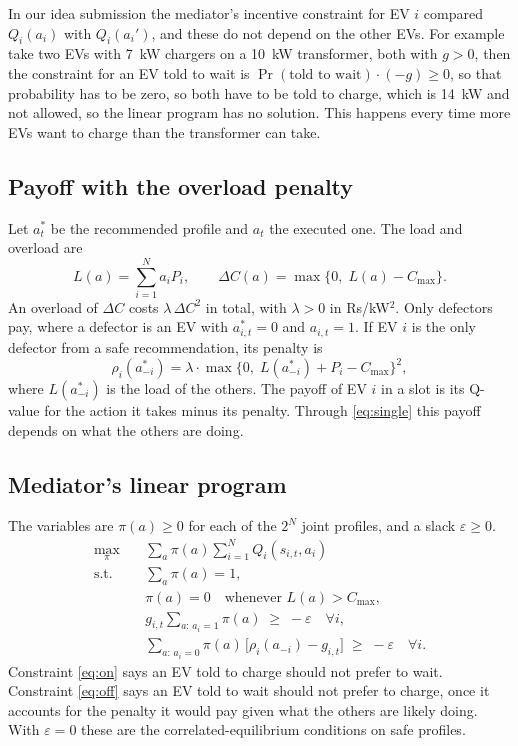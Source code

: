 \documentclass{article}
\newcommand{\cmax}{C_{\max}}
\begin{document}
In our idea submission the mediator's incentive constraint for EV $i$ compared $Q_i(a_i)$ with $Q_i(a_i')$, and these do not depend on the other EVs. For example take two EVs with 7~kW chargers on a 10~kW transformer, both with $g > 0$, then the constraint for an EV told to wait is $\Pr(\text{told to wait}) \cdot (-g) \ge 0$, so that probability has to be zero, so both have to be told to charge, which is 14~kW and not allowed, so the linear program has no solution. This happens every time more EVs want to charge than the transformer can take.

\subsection{Payoff with the overload penalty}

Let $a^*_t$ be the recommended profile and $a_t$ the executed one. The load and overload are
\begin{equation}
L(a) = \sum_{i=1}^{N} a_i P_i, \qquad \Delta C(a) = \max\{0,\; L(a) - \cmax\}.
\end{equation}
An overload of $\Delta C$ costs $\lambda\,\Delta C^2$ in total, with $\lambda > 0$ in Rs/kW$^2$. Only defectors pay, where a defector is an EV with $a^*_{i,t} = 0$ and $a_{i,t} = 1$. If EV $i$ is the only defector from a safe recommendation, its penalty is
\begin{equation}
\rho_i(a^*_{-i}) = \lambda \cdot \max\bigl\{0,\; L(a^*_{-i}) + P_i - \cmax\bigr\}^2 ,
\label{eq:single}
\end{equation}
where $L(a^*_{-i})$ is the load of the others. The payoff of EV $i$ in a slot is its Q-value for the action it takes minus its penalty. Through \eqref{eq:single} this payoff depends on what the others are doing.

\subsection{Mediator's linear program}

The variables are $\pi(a) \ge 0$ for each of the $2^N$ joint profiles, and a slack $\varepsilon \ge 0$.
\begin{align}
\max_{\pi}\quad & \sum_{a} \pi(a) \sum_{i=1}^{N} Q_i(s_{i,t}, a_i) \label{eq:obj}\\
\text{s.t.}\quad & \sum_{a} \pi(a) = 1, \\
& \pi(a) = 0 \quad \text{whenever } L(a) > \cmax, \label{eq:safe}\\
& g_{i,t} \sum_{a:\,a_i = 1} \pi(a) \;\ge\; -\varepsilon \quad \forall i, \label{eq:on}\\
& \sum_{a:\,a_i = 0} \pi(a)\,\bigl[\rho_i(a_{-i}) - g_{i,t}\bigr] \;\ge\; -\varepsilon \quad \forall i. \label{eq:off}
\end{align}
Constraint \eqref{eq:on} says an EV told to charge should not prefer to wait. Constraint \eqref{eq:off} says an EV told to wait should not prefer to charge, once it accounts for the penalty it would pay given what the others are likely doing. With $\varepsilon = 0$ these are the correlated-equilibrium conditions on safe profiles.
\end{document}
